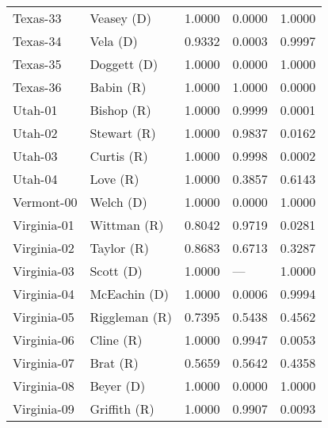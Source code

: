 \begin{longtable}{llrll}
          Texas-33 &          {\color{Blue} Veasey (D)} &       1.0000 &        0.0000 &        1.0000 \\
          Texas-34 &            {\color{Blue} Vela (D)} &       0.9332 &        0.0003 &        0.9997 \\
          Texas-35 &         {\color{Blue} Doggett (D)} &       1.0000 &        0.0000 &        1.0000 \\
          Texas-36 &            {\color{Red} Babin (R)} &       1.0000 &        1.0000 &        0.0000 \\
           Utah-01 &           {\color{Red} Bishop (R)} &       1.0000 &        0.9999 &        0.0001 \\
           Utah-02 &          {\color{Red} Stewart (R)} &       1.0000 &        0.9837 &        0.0162 \\
           Utah-03 &           {\color{Red} Curtis (R)} &       1.0000 &        0.9998 &        0.0002 \\
           Utah-04 &             {\color{Red} Love (R)} &       1.0000 &        0.3857 &        0.6143 \\
        Vermont-00 &           {\color{Blue} Welch (D)} &       1.0000 &        0.0000 &        1.0000 \\
       Virginia-01 &          {\color{Red} Wittman (R)} &       0.8042 &        0.9719 &        0.0281 \\
       Virginia-02 &           {\color{Red} Taylor (R)} &       0.8683 &        0.6713 &        0.3287 \\
       Virginia-03 &           {\color{Blue} Scott (D)} &       1.0000 &           --- &        1.0000 \\
       Virginia-04 &        {\color{Blue} McEachin (D)} &       1.0000 &        0.0006 &        0.9994 \\
       Virginia-05 &        {\color{Red} Riggleman (R)} &       0.7395 &        0.5438 &        0.4562 \\
       Virginia-06 &            {\color{Red} Cline (R)} &       1.0000 &        0.9947 &        0.0053 \\
       Virginia-07 &             {\color{Red} Brat (R)} &       0.5659 &        0.5642 &        0.4358 \\
       Virginia-08 &           {\color{Blue} Beyer (D)} &       1.0000 &        0.0000 &        1.0000 \\
       Virginia-09 &         {\color{Red} Griffith (R)} &       1.0000 &        0.9907 &        0.0093 \\

\end{longtable}
